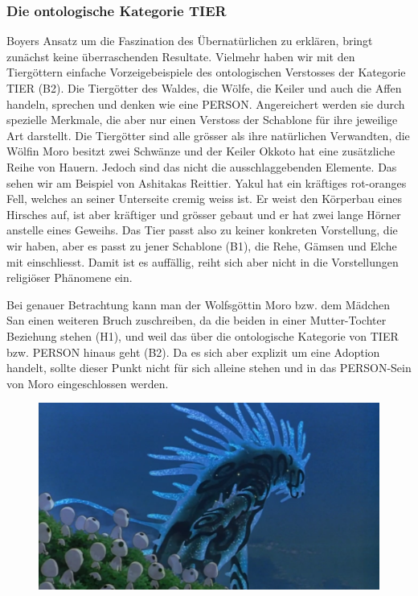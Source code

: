 \subsubsection{Die ontologische Kategorie TIER} 
Boyers Ansatz um die Faszination des Übernatürlichen zu erklären, bringt zu\-nächst keine überraschenden Resultate. Vielmehr haben wir mit den Tiergöttern einfache Vorzeigebeispiele des ontologischen Verstosses der Kategorie TIER (B2). Die Tiergötter des Waldes, die Wölfe, die Keiler und auch die Affen handeln, sprechen und denken wie eine PERSON. Angereichert werden sie durch spezielle Merkmale, die aber nur einen Verstoss der Schablone für ihre jeweilige Art darstellt. Die Tiergötter sind alle grösser als ihre natürlichen Verwandten, die Wölfin Moro besitzt zwei Schwänze und der Keiler Okkoto hat eine zusätzliche Reihe von Hauern. Jedoch sind das nicht die ausschlaggebenden Elemente. Das sehen wir am Beispiel von Ashitakas Reittier. Yakul hat ein kräftiges rot-oranges Fell, welches an seiner Unterseite cremig weiss ist. Er weist den Körperbau eines Hirsches auf, ist aber kräftiger und grösser gebaut und er hat zwei lange Hörner anstelle eines Geweihs. Das Tier passt also zu keiner konkreten Vorstellung, die wir haben, aber es passt zu jener Schablone (B1), die Rehe, Gämsen und Elche mit einschliesst. Damit ist es auffällig, reiht sich aber nicht in die Vorstellungen religiöser Phänomene ein. 

Bei genauer Betrachtung kann man der Wolfsgöttin Moro bzw. dem Mädchen San einen weiteren Bruch zuschreiben, da die beiden in einer Mutter-Tochter Beziehung stehen (H1), und weil das über die ontologische Kategorie von TIER bzw. PERSON hinaus geht (B2). Da es sich aber explizit um eine Adoption handelt, sollte dieser Punkt nicht für sich alleine stehen und in das PERSON-Sein von Moro eingeschlossen werden. 

\begin{figure}
  \centering
  \includegraphics[width=.8\linewidth]{images/00-57-44_mononoke.png}
  \label{fig:test2}
\end{figure}

